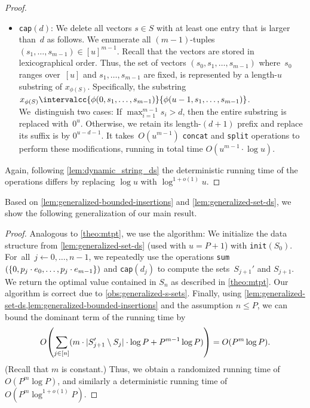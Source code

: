 \documentclass[10pt,a4paper]{article}
\DeclarePairedDelimiter\parens{\lparen}{\rparen}
\DeclarePairedDelimiter\set{\lbrace}{\rbrace}
\newcommand\Order{O}
\newcommand\order{o}
\newcommand\Oo{O}
\newcommand{\Op}[1]{{\normalfont\texttt{#1}}}
\begin{document}
\begin{proof}
\begin{itemize}
        In order to bound the running time, we bound the size of the sets $D_p$ and $D$. Using that~, we have that $|D_p| \leq 2 |(S + p) \setminus S| \leq 2 |(S + T) \setminus S|$, and therefore $|D| \leq 2|T| \cdot |(S + T) \setminus S|$. In total, we used $\Order(|D|)$ data structure operations, leading to a running time of $\Oo(|T| \cdot |(S+T)\setminus S| \cdot \log u)$.

        \item \Op{cap}$(d)$: 
        We delete all vectors $s \in S$ with at least one entry that is larger than~$d$ as follows. We enumerate all $(m-1)$-tuples $(s_1, \dots, s_{m-1}) \in [u]^{m-1}$. Recall that the vectors are stored in lexicographical order. Thus, the set of vectors $(s_0, s_1, \dots, s_{m-1})$ where~$s_0$ ranges over~$[u]$ and $s_1, \dots, s_{m-1}$ are fixed, is represented by a length-$u$ substring of $x_{\phi(S)}$. Specifically, the substring $x_{\phi(S)}\intervalcc{\phi(0, s_1, \dots, s_{m-1})}{\phi(u-1, s_1, \dots, s_{m-1})}$. We~distinguish two cases: If $\max_{i=1}^{m-1} s_i > d$, then the entire substring is replaced with~$0^u$. Otherwise, we retain its length-$(d+1)$ prefix and replace its suffix is by $0^{u-d-1}$.
        It takes~$\Oo(u^{m-1})$ \Op{concat} and \Op{split} operations to perform these modifications, running in total time $\Order(u^{m-1} \cdot \log u)$.
    \end{itemize}
    \smallskip
    Again, following \cref{lem:dynamic_string_ds} the deterministic running time of the operations differs by replacing $\log u$ with $\log^{1+\order(1)} u$.
\end{proof}

Based on \cref{lem:generalized-bounded-insertions} and \ref{lem:generalized-set-ds}, we show the following generalization of our main result.

\ManyMachinesAlgorithm*
\begin{proof}
    Analogous to \cref{theo:mtpt}, we use the algorithm:
    We initialize the data structure from \cref{lem:generalized-set-ds} (used with $u = P + 1$) with \Op{init}$(S_0)$.
    For~all~$j \gets 0, \dots, n-1$, we repeatedly use the operations \Op{sum}$(\set{0, p_j \cdot e_0, \dots, p_j \cdot e_{m-1}})$ and \Op{cap}$(d_j)$ to compute the sets~$S_{j+1}'$ and $S_{j+1}$. 
    We return the optimal value contained in $S_n$ as described in \cref{theo:mtpt}.
    Our algorithm is correct due to \cref{obs:generalized-s-sets}.
    Finally, using \cref{lem:generalized-set-ds,lem:generalized-bounded-insertions} and the assumption $n \leq P$, we can bound the dominant term of the running time by
    \begin{equation*}
        \Order\parens*{\sum_{j \in [n]} (m \cdot |S_{j+1}' \setminus S_j| \cdot \log P + P^{m-1} \log P)} = \Order(P^m \log P).
    \end{equation*}
    (Recall that $m$ is constant.) Thus, we obtain a randomized running time of $\Order(P^m \log P)$, and similarly a deterministic running time of~$\Order(P^m \log^{1+\order(1)} P)$.
\end{proof}
\end{document}
